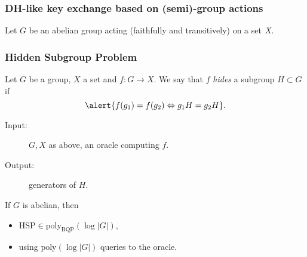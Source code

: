 \documentclass{beamer}
\begin{document}

\begin{frame}
  \frametitle{DH-like key exchange based on (semi)-group actions}
  
  Let \emph{$G$} be an abelian group acting (faithfully and
  transitively) on a set $\emph{X}$.

  \begin{center}
  \end{center}
\end{frame}


\begin{frame}
  \frametitle{Hidden Subgroup Problem}

  Let \emph{$G$} be a group, \emph{$X$} a set and \emph{$f:G\to X$}.
  We say that $f$ \emph{hides} a subgroup \emph{$H\subset G$} if
  \[\alert{f(g_1) = f(g_2) \Leftrightarrow g_1H = g_2H}.\]

  \begin{definition}
    \begin{description}
    \item[Input:] $G,X$ as above,  an oracle computing $f$.
    \item[Output:] generators of $H$.
    \end{description}
  \end{definition}

  \begin{theorem}
    If $G$ is abelian, then
    \begin{itemize}
    \item \alert{$\text{HSP}\in\text{poly}_\text{BQP}(\log|G|)$},
    \item using \alert{$\text{poly}(\log|G|)$} queries to the oracle.
    \end{itemize}
  \end{theorem}
\end{frame}
\end{document}
